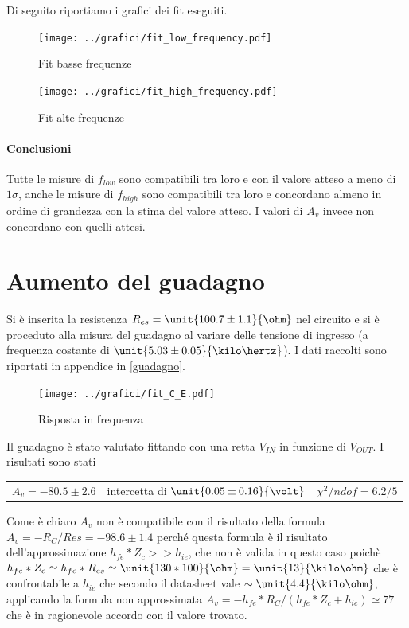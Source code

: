 \documentclass[10pt,a4paper]{article}
\begin{document}
Di seguito riportiamo i grafici dei fit eseguiti.
\begin{figure}[h!]
	\centering
	\begin{minipage}[c]{0.49\textwidth}
		\centering
		\texttt{[image: ../grafici/fit\_low\_frequency.pdf]}
		\caption{Fit basse frequenze}
	\end{minipage}
	\begin{minipage}[c]{0.49\textwidth}
		\centering
		\texttt{[image: ../grafici/fit\_high\_frequency.pdf]}
		\caption{Fit alte frequenze}
	\end{minipage}
\end{figure}

\paragraph{Conclusioni}
Tutte le misure di $f_{low}$ sono compatibili tra loro e con il valore atteso a meno di $1\sigma$, anche le misure di $f_{high}$ sono compatibili tra loro e concordano almeno in ordine di grandezza con la stima del valore atteso. I valori di $A_v$ invece non concordano con quelli attesi.

\section{Aumento del guadagno}

Si è inserita la resistenza $R_{es} = \unit{100.7 \pm 1.1}{\ohm}$ nel circuito e si è proceduto alla misura del guadagno al variare delle tensione di ingresso (a frequenza costante di $\unit{5.03 \pm 0.05}{\kilo\hertz}$). I dati raccolti sono riportati in appendice in \tablename{\ref{guadagno}}.

\begin{figure}[h!]
	\centering
		\texttt{[image: ../grafici/fit\_C\_E.pdf]}
		\caption{Risposta in frequenza}
\end{figure}

Il guadagno è stato valutato fittando con una retta $V_{IN}$ in funzione di $V_{OUT}$. I risultati sono stati
\begin{table}[h!]
\centering 
\begin{tabular}{ccc}
$A_v = -80.5 \pm 2.6$ & intercetta di $\unit{0.05 \pm 0.16}{\volt}$ & $\chi^2/ndof = 6.2/5$
\end{tabular}
\end{table}

Come è chiaro $A_v$ non è compatibile con il risultato della formula $A_v = -R_C/Res = -98.6 \pm 1.4$ perché questa formula è il risultato dell'approssimazione $h_{fe}*Z_c >> h_{ie}$, che non è valida in questo caso poichè $h_{fe} * Z_c \simeq h_{fe} * R_{es} \simeq \unit{130 * 100}{\ohm} = \unit{13}{\kilo\ohm} $ che è confrontabile a $h_{ie}$ che secondo il datasheet vale $\sim \unit{4.4}{\kilo\ohm}$, applicando la formula non approssimata $A_v = -h_{fe}*R_C/(h_{fe}*Z_c + h_{ie}) \simeq 77$ che è in ragionevole accordo con il valore trovato.
\pagebreak
\end{document}
